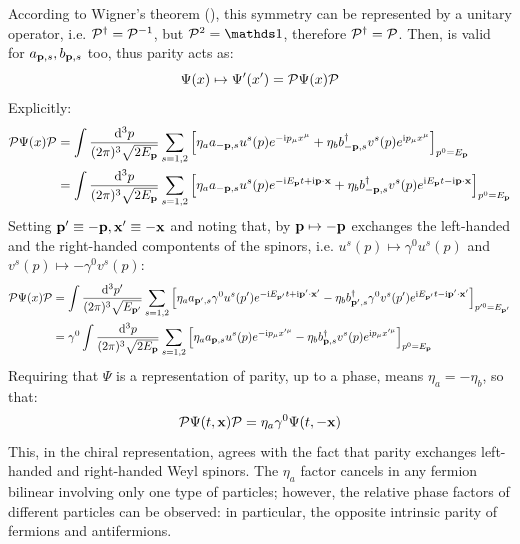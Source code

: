 According to Wigner's theorem (), this symmetry can be represented by a unitary operator, i.e. $ \mathcal{P}^\dagger = \mathcal{P}^{-1} $, but $ \parity^2 = \id $, therefore $ \mathcal{P}^\dagger = \mathcal{P} $. Then,  is valid for $ a_{\mathbf{p},s} , b_{\mathbf{p},s} $ too, thus parity acts as:
\begin{equation}
  \Psi(x) \mapsto \Psi'(x') = \mathcal{P} \Psi(x) \mathcal{P}
\end{equation}
Explicitly:
\begin{equation*}
  \begin{split}
    \mathcal{P} \Psi(x) \mathcal{P}
    &= \int \frac{\mathrm{d}^3p}{(2\pi)^3 \sqrt{2E_{\mathbf{p}}}} \sum_{s = 1,2} \left[ \eta_a a_{-\mathbf{p},s} u^s(p) e^{-\mathrm{i} p_\mu x^\mu} + \eta_b b_{-\mathbf{p},s}^\dagger v^s(p) e^{\mathrm{i} p_\mu x^\mu} \right]_{p^0 = E_{\mathbf{p}}} \\
    &= \int \frac{\mathrm{d}^3p}{(2\pi)^3 \sqrt{2E_{\mathbf{p}}}} \sum_{s = 1,2} \left[ \eta_a a_{-\mathbf{p},s} u^s(p) e^{-\mathrm{i} E_{\mathbf{p}} t + \mathrm{i} \mathbf{p} \cdot \mathbf{x}} + \eta_b b_{-\mathbf{p},s}^\dagger v^s(p) e^{\mathrm{i} E_{\mathbf{p}} t - \mathrm{i} \mathbf{p} \cdot \mathbf{x}} \right]_{p^0 = E_{\mathbf{p}}} \\
  \end{split}
\end{equation*}
Setting $ \mathbf{p}' \equiv - \mathbf{p} , \mathbf{x}' \equiv -\mathbf{x} $ and noting that, by  $ \mathbf{p} \mapsto -\mathbf{p} $ exchanges the left-handed and the right-handed compontents of the spinors, i.e. $ u^s(p) \mapsto \gamma^0 u^s(p) $ and $ v^s(p) \mapsto - \gamma^0 v^s(p) $:
\begin{equation*}
  \begin{split}
    \mathcal{P} \Psi(x) \mathcal{P}
    &= \int \frac{\mathrm{d}^3p'}{(2\pi)^3 \sqrt{E_{\mathbf{p}'}}} \sum_{s = 1,2} \left[ \eta_a a_{\mathbf{p}',s} \gamma^0 u^s(p') e^{-\mathrm{i} E_{\mathbf{p}'} t + \mathrm{i} \mathbf{p}' \cdot \mathbf{x}'} - \eta_b b_{\mathbf{p}',s}^\dagger \gamma^0 v^s(p') e^{\mathrm{i} E_{\mathbf{p}'} t - \mathrm{i} \mathbf{p}' \cdot \mathbf{x}'} \right]_{p'^0 = E_{\mathbf{p}'}} \\
    &= \gamma^0 \int \frac{\mathrm{d}^3p}{(2\pi)^3 \sqrt{2E_{\mathbf{p}}}} \sum_{s = 1,2} \left[ \eta_a a_{\mathbf{p},s} u^s(p) e^{-\mathrm{i} p_\mu x'^\mu} - \eta_b b_{\mathbf{p},s}^\dagger v^s(p) e^{\mathrm{i} p_\mu x'^\mu} \right]_{p^0 = E_{\mathbf{p}}}
  \end{split}
\end{equation*}
Requiring that $ \Psi $ is a representation of parity, up to a phase, means $ \eta_a = - \eta_b $, so that:
\begin{equation}
  \mathcal{P} \Psi(t,\mathbf{x}) \mathcal{P} = \eta_a \gamma^0 \Psi(t,-\mathbf{x})
\end{equation}
This, in the chiral representation, agrees with the fact that parity exchanges left-handed and right-handed Weyl spinors. The $ \eta_a $ factor cancels in any fermion bilinear involving only one type of particles; however, the relative phase factors of different particles can be observed: in particular, the opposite intrinsic parity of fermions and antifermions.

